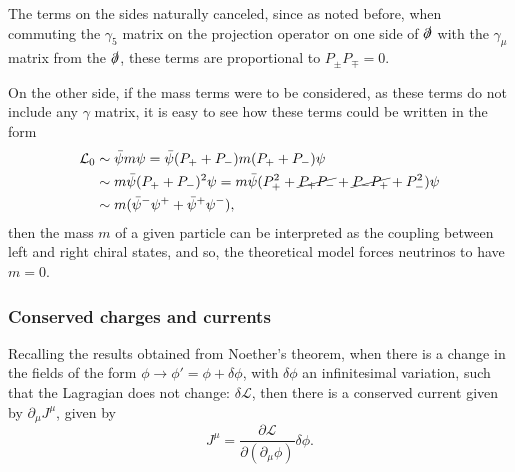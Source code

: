 The terms on the sides naturally canceled, since as noted before, when commuting the $\gamma_5$ matrix on the projection operator on one side of $\slashed{\partial}$ with the $\gamma_{\mu}$ matrix from the $\slashed{\partial}$, these terms are proportional to $P_{\pm}P_{\mp} = 0$. 

On the other side, if the mass terms were to be considered, as these terms do not include any $\gamma$ matrix, it is easy to see how these terms could be written in the form
\begin{align*}
    \mathcal{L}_0 &\sim \Bar{\psi}m\psi = \Bar{\psi}(P_+ + P_-)m(P_+ + P_-)\psi \\
    &\sim m\Bar{\psi}(P_+ + P_-)^2\psi = m\Bar{\psi}(P_+^2 + \cancel{P_+P_-} + \cancel{P_-P_+} + P_-^2)\psi \\
    &\sim m(\Bar{\psi}^-\psi^+ + \Bar{\psi}^+\psi^-),
\end{align*}
then the mass $m$ of a given particle can be interpreted as the coupling between left and right chiral states, and so, the theoretical model forces neutrinos to have $m=0$.

\subsubsection{Conserved charges and currents}

Recalling the results obtained from Noether's theorem, when there is a change in the fields of the form $\phi \rightarrow \phi' = \phi + \delta\phi$, with $\delta\phi$ an infinitesimal variation, such that the Lagragian does not change: $\delta\mathcal{L}$, then there is a conserved current given by $\partial_{\mu}J^{\mu}$, given by
\begin{equation*}
    J^{\mu} = \dfrac{\partial\mathcal{L}}{\partial(\partial_{\mu}\phi)}\delta\phi.
\end{equation*}

